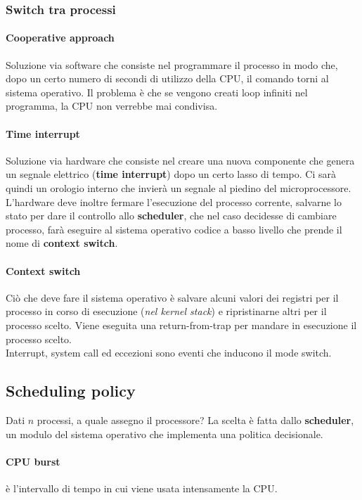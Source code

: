 \documentclass[12pt, letterpaper]{article}
\begin{document}
			\subsubsection{Switch tra processi}
				
				\paragraph{Cooperative approach} Soluzione via software che consiste nel programmare il processo in modo che, dopo un certo numero di secondi di utilizzo della CPU, il comando torni al sistema operativo. Il problema è che se vengono creati loop infiniti nel programma, la CPU non verrebbe mai condivisa.
				
				\paragraph{Time interrupt} Soluzione via hardware che consiste nel creare una nuova componente che genera un segnale elettrico (\textbf{time interrupt}) dopo un certo lasso di tempo. Ci sarà quindi un orologio interno che invierà un segnale al piedino del microprocessore. L'hardware deve inoltre fermare l'esecuzione del processo corrente, salvarne lo stato per dare il controllo allo \textbf{scheduler}, che nel caso decidesse di cambiare processo, farà eseguire al sistema operativo codice a basso livello che prende il nome di \textbf{context switch}. 
				
				\paragraph{Context switch} Ciò che deve fare il sistema operativo è salvare alcuni valori dei registri per il processo in corso di esecuzione (\textit{nel kernel stack}) e ripristinarne altri per il processo scelto. Viene eseguita una return-from-trap per mandare in esecuzione il processo scelto.\\
				Interrupt, system call ed eccezioni sono eventi che inducono il mode switch. 

		\subsection{Scheduling policy}
			Dati $n$ processi, a quale assegno il processore?
			La scelta è fatta dallo \textbf{scheduler}, un modulo del sistema operativo che implementa una politica decisionale.
			\paragraph{CPU burst} è l'intervallo di tempo in cui viene usata intensamente la CPU. 
\end{document}
